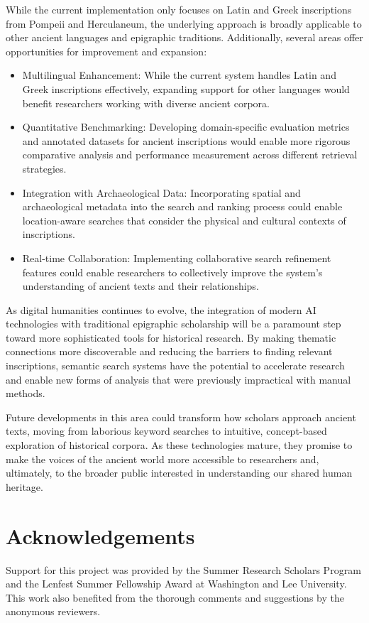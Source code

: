 \documentclass[final,greek,american]{anthology-ch}
\begin{document}
While the current implementation only focuses on Latin and Greek inscriptions from Pompeii and Herculaneum, the underlying approach is broadly applicable to other ancient languages and epigraphic traditions. Additionally, several areas offer opportunities for improvement and expansion:

\begin{itemize}
\item Multilingual Enhancement: While the current system handles Latin and Greek inscriptions effectively, expanding support for other languages would benefit researchers working with diverse ancient corpora.

\item Quantitative Benchmarking: Developing domain-specific evaluation metrics and annotated datasets for ancient inscriptions would enable more rigorous comparative analysis and performance measurement across different retrieval strategies.

\item Integration with Archaeological Data: Incorporating spatial and archaeological metadata into the search and ranking process could enable location-aware searches that consider the physical and cultural contexts of inscriptions.

\item Real-time Collaboration: Implementing collaborative search refinement features could enable researchers to collectively improve the system's understanding of ancient texts and their relationships.
\end{itemize}

As digital humanities continues to evolve, the integration of modern AI technologies with traditional epigraphic scholarship will be a paramount step toward more sophisticated tools for historical research. By making thematic connections more discoverable and reducing the barriers to finding relevant inscriptions, semantic search systems have the potential to accelerate research and enable new forms of analysis that were previously impractical with manual methods.

Future developments in this area could transform how scholars approach ancient texts, moving from laborious keyword searches to intuitive, concept-based exploration of historical corpora. As these technologies mature, they promise to make the voices of the ancient world more accessible to researchers and, ultimately, to the broader public interested in understanding our shared human heritage.

\section*{Acknowledgements}
Support for this project was provided by the Summer Research Scholars Program and the Lenfest Summer Fellowship Award at Washington and Lee University.
This work also benefited from the thorough comments and suggestions by the anonymous reviewers.

\printbibliography
\end{document}
